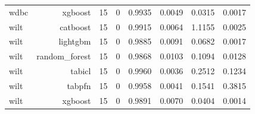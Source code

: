 \begin{table}[htbp]
\begin{tabular}{lrrrrrrr}
wdbc & xgboost & 15 & 0 & 0.9935 & 0.0049 & 0.0315 & 0.0017 \\
wilt & catboost & 15 & 0 & 0.9915 & 0.0064 & 1.1155 & 0.0025 \\
wilt & lightgbm & 15 & 0 & 0.9885 & 0.0091 & 0.0682 & 0.0017 \\
wilt & random\_forest & 15 & 0 & 0.9868 & 0.0103 & 0.1094 & 0.0128 \\
wilt & tabicl & 15 & 0 & 0.9960 & 0.0036 & 0.2512 & 0.1234 \\
wilt & tabpfn & 15 & 0 & 0.9958 & 0.0041 & 0.1541 & 0.3815 \\
wilt & xgboost & 15 & 0 & 0.9891 & 0.0070 & 0.0404 & 0.0014 \\
\hline
\end{tabular}
\end{table}
